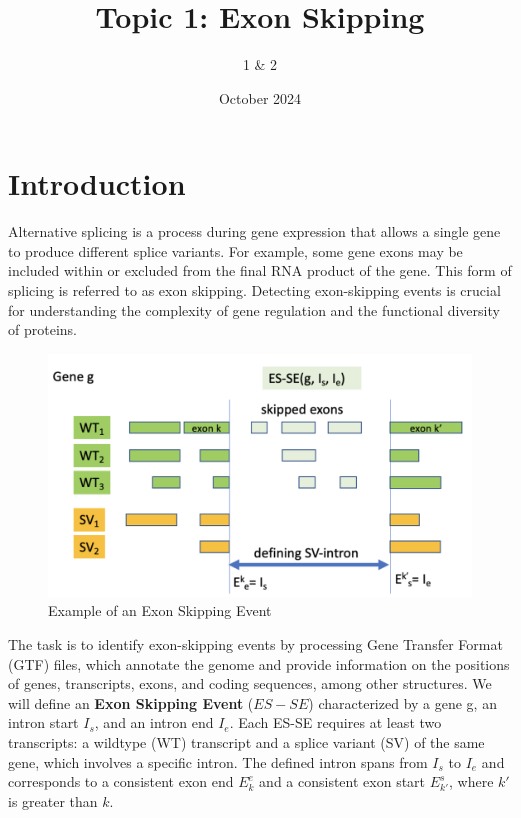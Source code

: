 \documentclass{article}
\title{Topic 1: Exon Skipping}
\author{1 \&  2 }
\date{October 2024}
\begin{document}
    \maketitle
    \tableofcontents
    \pagebreak


    \section{Introduction}
    Alternative splicing is a process during gene expression that allows a single gene to produce different splice variants. For example, some gene exons may be included within or excluded from the final RNA product of the gene. This form of splicing is referred to as exon skipping. Detecting exon-skipping events is crucial for understanding the complexity of gene regulation and the functional diversity of proteins.

    \begin{figure}
        \centering
        \includegraphics[width=1.0\textwidth]{figures/exonskipping/exon_skipping_diagram.png}
        \caption{Example of an Exon Skipping Event}
        \label{fig:exon_skip_diagram}
    \end{figure}

    The task is to identify exon-skipping events by processing Gene Transfer Format (GTF) files, which annotate the genome and provide information on the positions of genes, transcripts, exons, and coding sequences, among other structures. We will define an \textbf{Exon Skipping Event} (\(ES-SE\)) characterized by a gene g, an intron start \(I_s\), and an intron end \(I_e\). Each ES-SE requires at least two transcripts: a wildtype (WT) transcript and a splice variant (SV) of the same gene, which involves a specific intron. The defined intron spans from \(I_s\) to \(I_e\) and corresponds to a consistent exon end \(E_k^e\) and a consistent exon start \(E_{k'}^s\), where \(k'\) is greater than \(k\).
\end{document}

